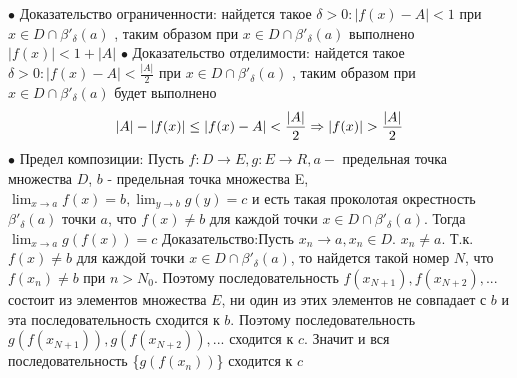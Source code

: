 \documentclass[12pt]{article}
\begin{document}
$\bullet$ Доказательство ограниченности: найдется такое  $\delta > 0: |f(x) - A| < 1$ при $x \in D \cap \beta'_{\delta}(a)$ , таким образом при $x \in D \cap \beta'_{\delta}(a)$ выполнено $|f(x) | < 1 + |A|$\newline
$\bullet$ Доказательство отделимости: найдется такое  $\delta > 0: |f(x) - A| < \frac{|A|}{2}$ при $x \in D \cap \beta'_{\delta}(a)$ , таким образом при $x \in D \cap \beta'_{\delta}(a)$ будет выполнено 
$$
|A| - |f(x)| \leq |f(x) - A| < \frac{|A|}{2} \Rightarrow \\ |f(x)| > \frac{|A|}{2}
$$\newline
$\bullet$ Предел композиции:\newline
Пусть $f: D \xrightarrow{} E, g: E \xrightarrow{} R, a - $ предельная точка множества $D$, $b$ - предельная точка множества E, $\lim_{x \to a} f(x) = b, \lim_{y \to b} g(y) = c$ и есть такая проколотая окрестность $\beta'_{\delta}(a)$ точки $a$, что $f(x) \not = b $ для каждой точки $x \in D \cap \beta'_{\delta}(a)$. Тогда $\lim_{x \to a} g(f(x)) = c$\newline
Доказательство:\newline Пусть $x_n \xrightarrow{} a, x_n \in D$. $ x_n \not = a.$ Т.к. $f(x) \not = b$ для каждой точки $x \in D \cap \beta'_{\delta}(a)$, то найдется такой номер $N$, что $f(x_n) \not = b$ при $n > N_0$. Поэтому последовательность $f(x_{N+1}), f(x_{N+2}), ...$ состоит из элементов множества $E$, ни один из этих элементов не совпадает с $b$ и эта последовательность сходится к $b$. Поэтому последовательность $g(f(x_{N+1})), g(f(x_{N+2})), ... $ сходится к $c$. Значит и вся последовательность \{$g(f(x_n))$\} сходится к $c$  \newline
\end{document}
